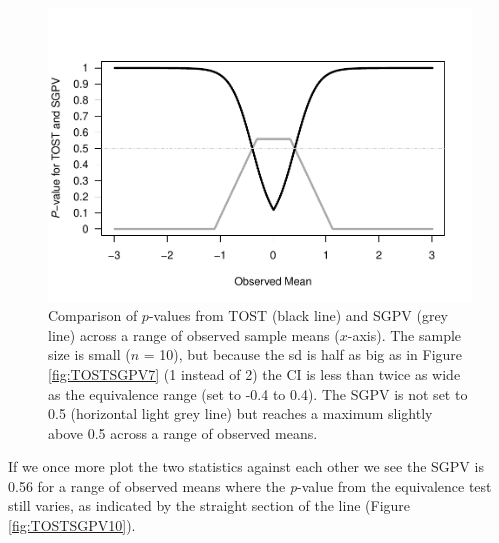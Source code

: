 \documentclass[
  english,
  man]{apa6}
\begin{document}
\begin{figure}

{\centering \includegraphics[height=0.94\textheight]{chp5_format-Rmd_bib_files/figure-latex/TOSTSGPV9-1} 

}

\caption{Comparison of $p$-values from TOST (black line) and SGPV (grey line) across a range of observed sample means ($x$-axis). The sample size is small ($n$ = 10), but because the sd is half as big as in Figure \ref{fig:TOSTSGPV7} (1 instead of 2) the CI is less than twice as wide as the equivalence range (set to -0.4 to 0.4). The SGPV is not set to 0.5 (horizontal light grey line) but reaches a maximum slightly above 0.5 across a range of observed means.}\label{fig:TOSTSGPV9}
\end{figure}

If we once more plot the two statistics against each other we see the SGPV is 0.56 for a range of observed means where the \emph{p}-value from the equivalence test still varies, as indicated by the straight section of the line (Figure \ref{fig:TOSTSGPV10}).
\end{document}
